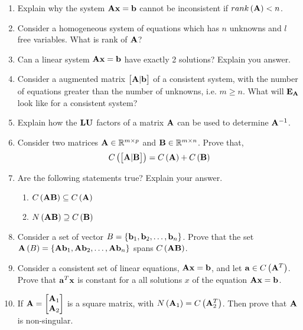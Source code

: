 \documentclass[9pt]{article}
\def\mf{\ensuremath\mathbf}
\def\mb{\ensuremath\mathbb}
\def\lp{\ensuremath\left(}
\def\rp{\ensuremath\right)}
\def\lc{\ensuremath\left\{}
\def\rc{\ensuremath\right\}}
\def\bmx{\ensuremath\begin{bmatrix*}[r]}
\def\emx{\ensuremath\end{bmatrix*}}
\newcommand{\ct}[1]{\lp #1\rp}
\begin{document}
\begin{multicols}{2}
\begin{enumerate}[resume]
    \item Explain why the system $\mf{A}\mf{x} = \mf{b}$ cannot be inconsistent if $rank\ct{\mf{A}} < n$.

    \item Consider a homogeneous system of equations which has $n$ unknowns and $l$ free variables. What is rank of $\mf{A}$?

    \item Can a linear system $\mf{A}\mf{x} = \mf{b}$ have exactly 2 solutions? Explain you answer.

    \item Consider a augmented matrix $\bmx \mf{A} \vert \mf{b}\emx$ of a consistent system, with the number of equations greater than the number of unknowns, i.e. $m \geq n$. What will $\mf{E_A}$ look like for a consistent system?

    \item Explain how the $\mf{LU}$ factors of a matrix $\mf{A}$ can be used to determine $\mf{A}^{-1}$.

    \item Consider two matrices $\mf{A} \in \mb{R}^{m \times p}$ and $\mf{B} \in \mb{R}^{m \times n}$. Prove that,
    \[ C\ct{\bmx \mf{A} \vert \mf{B} \emx} = C\ct{\mf{A}} + C\ct{\mf{B}} \]

    \item Are the following statements true? Explain your answer.
    \begin{enumerate}
        \item $C\ct{\mf{AB}} \subseteq C\ct{\mf{A}}$
        \item $N\ct{\mf{AB}} \supseteq C\ct{\mf{B}}$
    \end{enumerate}

    \item Consider a set of vector $B = \lc \mf{b}_1, \mf{b}_2, \ldots, \mf{b}_n\rc$. Prove that the set $\mf{A}\ct{B} = \lc \mf{A}\mf{b}_1, \mf{A}\mf{b}_2, \ldots, \mf{A}\mf{b}_n\rc$ spans $C\ct{\mf{AB}}$.

    \item Consider a consistent set of linear equations, $\mf{A}\mf{x} = \mf{b}$, and let $\mf{a} \in C\ct{\mf{A}^T}$. Prove that $\mf{a}^T\mf{x}$ is constant for a all solutions $x$ of the equation $\mf{A}\mf{x} = \mf{b}$.

    \item If $\mf{A} = \bmx \mf{A}_1 \\ \mf{A}_2 \emx$ is a square matrix, with $N\ct{\mf{A}_1} = C\ct{\mf{A}_2^T}$. Then prove that $\mf{A}$ is non-singular.


\end{enumerate}
\end{multicols}
\end{document}
